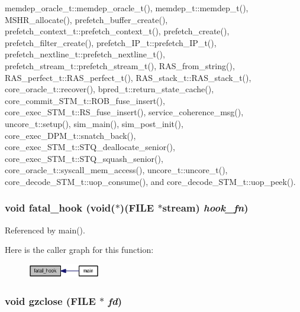 memdep\_\-oracle\_\-t::memdep\_\-oracle\_\-t(), memdep\_\-t::memdep\_\-t(), MSHR\_\-allocate(), prefetch\_\-buffer\_\-create(), prefetch\_\-context\_\-t::prefetch\_\-context\_\-t(), prefetch\_\-create(), prefetch\_\-filter\_\-create(), prefetch\_\-IP\_\-t::prefetch\_\-IP\_\-t(), prefetch\_\-nextline\_\-t::prefetch\_\-nextline\_\-t(), prefetch\_\-stream\_\-t::prefetch\_\-stream\_\-t(), RAS\_\-from\_\-string(), RAS\_\-perfect\_\-t::RAS\_\-perfect\_\-t(), RAS\_\-stack\_\-t::RAS\_\-stack\_\-t(), core\_\-oracle\_\-t::recover(), bpred\_\-t::return\_\-state\_\-cache(), core\_\-commit\_\-STM\_\-t::ROB\_\-fuse\_\-insert(), core\_\-exec\_\-STM\_\-t::RS\_\-fuse\_\-insert(), service\_\-coherence\_\-msg(), uncore\_\-t::setup(), sim\_\-main(), sim\_\-post\_\-init(), core\_\-exec\_\-DPM\_\-t::snatch\_\-back(), core\_\-exec\_\-STM\_\-t::STQ\_\-deallocate\_\-senior(), core\_\-exec\_\-STM\_\-t::STQ\_\-squash\_\-senior(), core\_\-oracle\_\-t::syscall\_\-mem\_\-access(), uncore\_\-t::uncore\_\-t(), core\_\-decode\_\-STM\_\-t::uop\_\-consume(), and core\_\-decode\_\-STM\_\-t::uop\_\-peek().
\subsubsection[{fatal\_\-hook}]{\setlength{\rightskip}{0pt plus 5cm}void fatal\_\-hook (void($\ast$)(FILE $\ast$stream) {\em hook\_\-fn})}\label{misc_8h_cfcad0cdbb8b3f0426d466279f8f821e}




Referenced by main().

Here is the caller graph for this function:\nopagebreak
\begin{figure}[H]
\begin{center}
\leavevmode
\includegraphics[width=90pt]{misc_8h_cfcad0cdbb8b3f0426d466279f8f821e_icgraph}
\end{center}
\end{figure}
\subsubsection[{gzclose}]{\setlength{\rightskip}{0pt plus 5cm}void gzclose (FILE $\ast$ {\em fd})}\label{misc_8h_55b2af0c5efe6baf67e4a2f1439be259}


